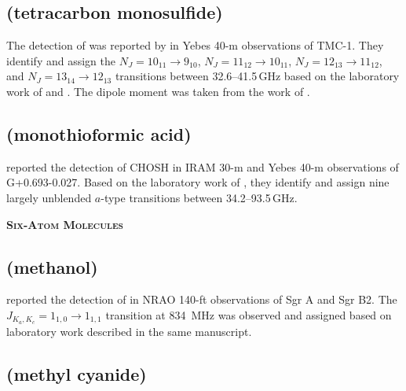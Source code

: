 \documentclass[twocolumn]{aastex631}
\newcommand{\update}[1]{{#1}}
\begin{document}
	\subsection{\update{ (tetracarbon monosulfide)}}
	\label{C4S}
	
	\update{The detection of  was reported by \citet{Cernicharo:2021ke} in Yebes 40-m observations of TMC-1.  They identify and assign the $N_J = 10_{11} \rightarrow 9_{10}$, $N_J = 11_{12} \rightarrow 10_{11}$, $N_J = 12_{13} \rightarrow 11_{12}$, and $N_J = 13_{14} \rightarrow 12_{13}$ transitions between 32.6--41.5\,GHz based on the laboratory work of \citet{Hirahara:1993ud} and \citet{Gordon:2001pd}.  The dipole moment was taken from the work of \citet{Lee:1997wu}.}	
	
	\subsection{\update{ (monothioformic acid)}}
	\label{CHOSH}
	
	\update{\citet{RodriguezAlmeida:2021ht} reported the detection of CHOSH in IRAM 30-m and Yebes 40-m observations of G+0.693-0.027.  Based on the laboratory work of \citet{Hocking1976ld}, they identify and assign nine largely unblended $a$-type transitions between 34.2--93.5\,GHz.}	
		
    
    \begin{center}
        \large
        \textsc{\textbf{Six-Atom Molecules}}
        \label{6atoms}
        \normalsize
    \end{center}        
    
    \subsection{ (methanol)}
	\label{CH3OH}
	
	\citet{Ball:1970gi} reported the detection of  in NRAO 140-ft observations of Sgr A and Sgr B2.  The $J_{K_a,K_c} = 1_{1,0}\rightarrow1_{1,1}$ transition at 834~MHz was observed and assigned based on laboratory work described in the same manuscript.  
	
	\subsection{ (methyl cyanide)}
	\label{CH3CN}
	
\end{document}
